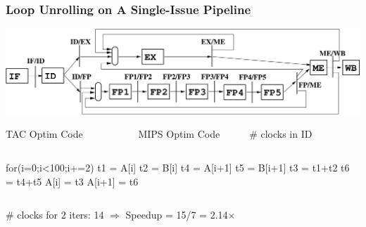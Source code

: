 \documentclass{beamer}
\renewcommand{\emph}[1]{\textcolor{structure}{#1}}
\newcommand{\emp}[1]{\textcolor{DikuRed}{ #1}}
\begin{document}
\begin{frame}[fragile,t]
    \frametitle{Loop Unrolling on A Single-Issue Pipeline}

\includegraphics[width=50ex]{Figures/SimpleOoOPipeline}

\begin{block}{TAC Optim Code{\tt~~~~~~~~~~~}MIPS Optim Code~~~~~~\# clocks in ID}\vspace{-2ex}
\begin{columns}
\begin{colorcode}[fontsize=\scriptsize]
for(i=0;i<100;i+=2)
  t1 = \emph{A[i]}
  t2 = \emph{B[i]}
  t4 = \emph{A[i+1]}
  t5 = \emph{B[i+1]}
  t3 = t1+t2
  t6 = t4+t5
  \emp{A[i]} = t3
  \emp{A[i+1]} = t6
\end{colorcode}
\end{columns}
\end{block}
\smallskip 

\# clocks for 2 iters: 14 $\Rightarrow$ Speedup = 15/7 = 2.14$\times$

\end{frame}
\end{document}
